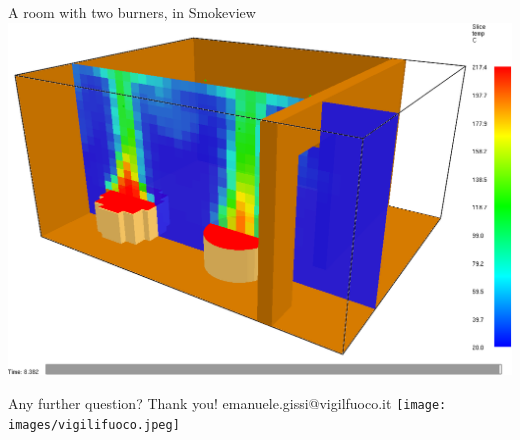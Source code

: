 \documentclass[aspectratio=169]{beamer}
\begin{document}
\begin{frame}[fragile]{A room with two burners, in Smokeview}
  \centering
  \vfill
  \includegraphics[width=.6\linewidth]{images/smv_case.png}
  \vfill
\end{frame}

\begin{frame}[fragile]{}
  \centering
  \vfill
  {\fontsize{20}{50}\selectfont Any further question?}
  \linebreak
  {\fontsize{40}{50}\selectfont Thank you!}
  \linebreak
  {\fontsize{15}{50}\selectfont emanuele.gissi@vigilfuoco.it}
  \centering
  \vfill
  \texttt{[image: images/vigilifuoco.jpeg]}
  \vfill
\end{frame}
\end{document}
